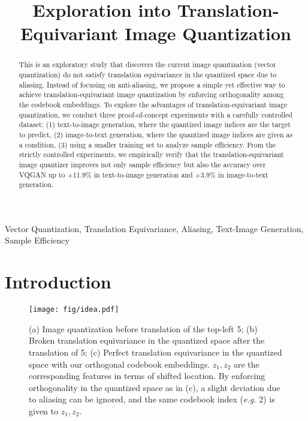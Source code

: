 \documentclass{article}
\title{Exploration into Translation-Equivariant Image Quantization}
\begin{document}
%
\maketitle
%
\begin{abstract}
This is an exploratory study that discovers the current image quantization (vector quantization) do not satisfy translation equivariance in the quantized space due to aliasing.
Instead of focusing on anti-aliasing, we propose a simple yet effective way to achieve translation-equivariant image quantization by enforcing orthogonality among the codebook embeddings.
To explore the advantages of translation-equivariant image quantization, we conduct three proof-of-concept experiments with a carefully controlled dataset:
(1) text-to-image generation, where the quantized image indices are the target to predict,
(2) image-to-text generation, where the quantized image indices are given as a condition,
(3) using a smaller training set to analyze sample efficiency.
From the strictly controlled experiments, we empirically verify that the translation-equivariant image quantizer improves not only sample efficiency but also the accuracy over VQGAN up to +11.9\% in text-to-image generation and +3.9\% in image-to-text generation.
\end{abstract}
%
\begin{keywords}
Vector Quantization, Translation Equivariance, Aliasing, Text-Image Generation, Sample Efficiency
\end{keywords}
%
\section{Introduction}
\label{sec:intro}

\begin{figure}[t]
   \centering
   \texttt{[image: fig/idea.pdf]}
   \vspace{-1mm}
   \caption{(a) Image quantization before translation of the top-left 5; (b) Broken translation equivariance in the quantized space after the translation of 5; (c) Perfect translation equivariance in the quantized space with our orthogonal codebook embeddings. $z_1, z_2$ are the corresponding features in terms of shifted location. By enforcing orthogonality in the quantized space as in (c), a slight deviation due to aliasing can be ignored, and the same codebook index (\textit{e.g.} 2) is given to $z_1, z_2$.}
    \label{fig:idea}
\end{figure}
\vspace{-1mm}
\end{document}
